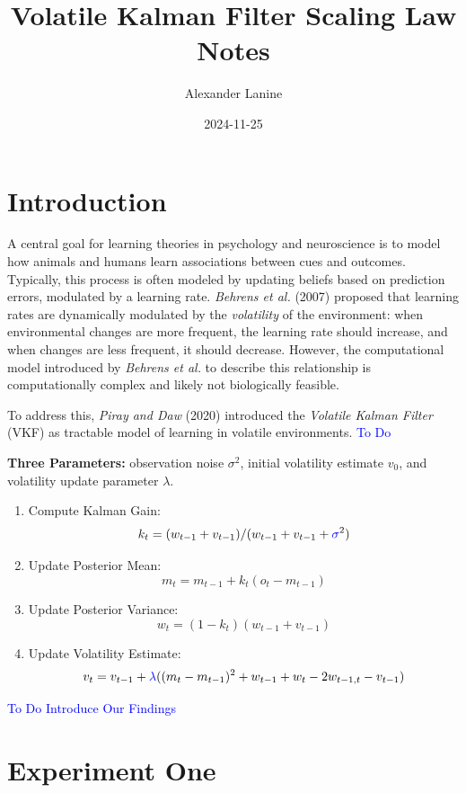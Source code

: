 \documentclass[12pt]{article}
\title{Volatile Kalman Filter Scaling Law Notes}
\author{Alexander Lanine}
\date{2024-11-25}
\theoremstyle{definition}
\begin{document}
\maketitle

\section*{Introduction}

A central goal for learning theories in psychology and neuroscience is to model how animals and humans learn associations between cues and outcomes. 
Typically, this process is often modeled by updating beliefs based on prediction errors, modulated by a learning rate. 
\textit{Behrens et al.} (2007) proposed that learning rates are dynamically modulated by the \textit{volatility} of the environment: when environmental changes are more frequent, the learning rate should increase, and when changes are less frequent, it should decrease. 
However, the computational model introduced by \textit{Behrens et al.} to describe this relationship is computationally complex and likely not biologically feasible.

To address this, \textit{Piray and Daw} (2020) introduced the \textit{Volatile Kalman Filter} (VKF) as tractable model of learning in volatile environments.
\textcolor{blue}{To Do}

\textbf{Three Parameters:} 
    observation noise $\sigma^2$, initial volatility estimate $v_0$, and volatility update parameter $\lambda$. 

    \begin{enumerate}
        \item Compute Kalman Gain: 
        $$k_t = (w_{t-1}+v_{t-1})/(w_{t-1}+v_{t-1}+\textcolor{blue}{\sigma}^2)$$


        \item Update Posterior Mean:
        $$m_t = m_{t-1} + k_t(o_t-m_{t-1})$$

        \item Update Posterior Variance: 
        $$w_t = (1-k_t)(w_{t-1}+v_{t-1})$$

        \item Update Volatility Estimate: 
        $$v_t = v_{t-1} + \textcolor{blue}{\lambda}
         ((m_t-m_{t-1})^2+w_{t-1}+w_t-2w_{t-1,t}-v_{t-1})$$
    \end{enumerate}

\textcolor{blue}{To Do Introduce Our Findings} 

\newpage 
\section*{Experiment One}
\end{document}
